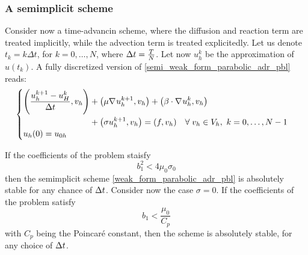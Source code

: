 \subsubsection{A semimplicit scheme}
Consider now a time-advancin scheme, where the diffusion and reaction term are treated implicitly, while the advection term is treated explicitedly. Let us denote \(t_k = k\Delta t\), for \(k = 0, \ldots, N\), where \(\Delta t = \frac{T}{N}\). Let now \(u_h^{k}\) be the approximation of \(u(t_k)\). A fully discretized version of \eqref{semi_weak_form_parabolic_adr_pbl} reads:
\begin{equation}
    \begin{cases}
        \begin{aligned}
            \left( \dfrac{u_h^{k+1}- u^k_H}{\Delta t}, v_h \right) &+ \left( \mu \nabla\mspace{1mu} u_h^{k+1}, v_h \right) + \left( \beta \cdot \nabla\mspace{1mu} u_h^{k} , v_h \right) \\
            &+ \left( \sigma u_h^{k+1}, v_h \right) = (f,v_h) \quad \forall \; v_h \in V_h, \ k = 0, \ldots, N-1
        \end{aligned} \\
        u_h(0) = u_{0h}
    \end{cases}
    \label{weak_form_parabolic_adr_pbl}
\end{equation}
\begin{theorem}
    If the coefficients of the problem staisfy 
    \begin{equation}
        b_1^2 < 4\mu_0 \sigma_0
        \label{30_slide_pbl}
    \end{equation}
    then the semimplicit scheme \eqref{weak_form_parabolic_adr_pbl} is absolutely stable for any chance of \(\Delta t\). Consider now the case \(\sigma = 0\). If the coefficients of the problem satisfy 
    \begin{equation}
        b_1 < \frac{\mu_0}{C_p}
    \end{equation}
    with \(C_p\) being the Poincaré constant, then the scheme is absolutely stable, for any choice of \(\Delta t\).
\end{theorem}
